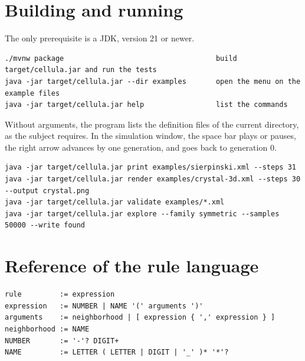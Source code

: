 \section{Building and running}
\label{app:usage}

The only prerequisite is a JDK, version 21 or newer.

\begin{lstlisting}[style=text]
./mvnw package                                    build target/cellula.jar and run the tests
java -jar target/cellula.jar --dir examples       open the menu on the example files
java -jar target/cellula.jar help                 list the commands
\end{lstlisting}

Without arguments, the program lists the definition files of the current directory, as the
subject requires. In the simulation window, the space bar plays or pauses, the right arrow
advances by one generation, and  goes back to generation 0.

\begin{lstlisting}[style=text]
java -jar target/cellula.jar print examples/sierpinski.xml --steps 31
java -jar target/cellula.jar render examples/crystal-3d.xml --steps 30 --output crystal.png
java -jar target/cellula.jar validate examples/*.xml
java -jar target/cellula.jar explore --family symmetric --samples 50000 --write found
\end{lstlisting}

\section{Reference of the rule language}
\label{app:language}

\begin{lstlisting}[style=text]
rule         := expression
expression   := NUMBER | NAME '(' arguments ')'
arguments    := neighborhood | [ expression { ',' expression } ]
neighborhood := NAME
NUMBER       := '-'? DIGIT+
NAME         := LETTER ( LETTER | DIGIT | '_' )* '*'?
\end{lstlisting}

